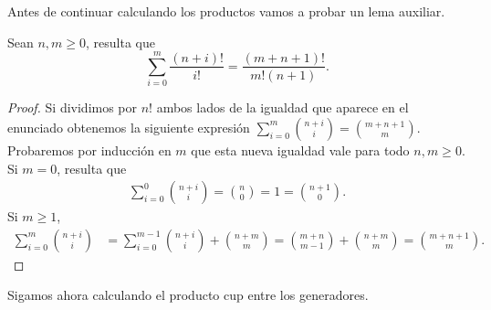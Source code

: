 \documentclass[fleqn,../tesis.tex]{subfiles}
\begin{document}
$ $

Antes de continuar calculando los productos vamos a probar un lema auxiliar.
\begin{lema}\label{combinatorio_recursivo}
	Sean $n, m\geq 0$, resulta que
	\[
		\sum_{i = 0}^{m}\frac{(n + i)!}{i!} = \frac{(m + n + 1)!}{m!(n + 1)}.
	\]
\end{lema}
\begin{proof}
	Si dividimos por $n!$ ambos lados de la igualdad que aparece en el enunciado obtenemos
	la siguiente expresión $\sum_{i = 0}^{m}\binom{n + i}{i} = \binom{m + n + 1}{m}$.
	Probaremos por inducción en $m$ que esta nueva igualdad vale para todo $n,m \geq 0$.
	Si $m = 0$, resulta que
	\begin{align*}
		\sum_{i = 0}^{0}\binom{n + i}{i} = \binom{n}{0} = 1 = \binom{n + 1}{0}.
	\end{align*}
	Si $m \geq 1$,
	\begin{align*}
		\sum_{i = 0}^{m}\binom{n + i}{i} &= \sum_{i = 0}^{m - 1}\binom{n + i}{i} + \binom{n + m}{m}
			= \binom{m + n}{m - 1} + \binom{n + m}{m} = \binom{m + n + 1}{m}.
	\end{align*}
\end{proof}

Sigamos ahora calculando el producto cup entre los generadores.
\end{document}
